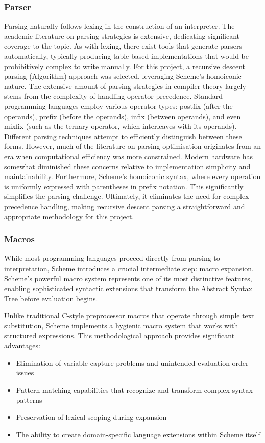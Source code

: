 \documentclass[final]{cmpreport_02}
\begin{document}
\subsubsection{Parser}
Parsing naturally follows lexing in the construction of an interpreter. The academic literature on parsing strategies is extensive, \cite{aho2006compilers} dedicating significant coverage to the topic. 
As with lexing, there exist tools that generate parsers automatically, typically producing table-based implementations that would be prohibitively complex to write manually. For this project, a recursive descent parsing (Algorithm) approach was selected, leveraging Scheme's homoiconic nature.
The extensive amount of parsing strategies in compiler theory largely stems from the complexity of handling operator precedence. Standard programming languages employ various operator types: postfix (after the operands), prefix (before the operands), infix (between operands), and even mixfix (such as the ternary operator, which interleaves with its operands). Different parsing techniques attempt to efficiently distinguish between these forms.
However, much of the literature on parsing optimisation originates from an era when computational efficiency was more constrained. Modern hardware has somewhat diminished these concerns relative to implementation simplicity and maintainability.
Furthermore, Scheme's homoiconic syntax, where every operation is uniformly expressed with parentheses in prefix notation. This significantly simplifies the parsing challenge. Ultimately, it eliminates the need for complex precedence handling, making recursive descent parsing a straightforward and appropriate methodology for this project.

\subsubsection{Macros}
While most programming languages proceed directly from parsing to interpretation, Scheme introduces a crucial intermediate step: macro expansion. Scheme's powerful macro system represents one of its most distinctive features, enabling sophisticated syntactic extensions that transform the Abstract Syntax Tree before evaluation begins.

Unlike traditional C-style preprocessor macros that operate through simple text substitution, Scheme implements a hygienic macro system that works with structured expressions. This methodological approach provides significant advantages:

\begin{itemize}
    \item Elimination of variable capture problems and unintended evaluation order issues
    \item Pattern-matching capabilities that recognize and transform complex syntax patterns
    \item Preservation of lexical scoping during expansion
    \item The ability to create domain-specific language extensions within Scheme itself
\end{itemize}
\end{document}

